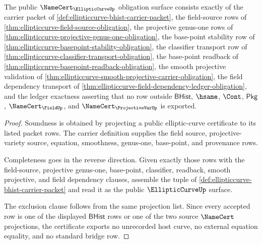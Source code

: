 \begin{theorem}\label{thm:ellipticcurve-namecert-exactness-obligation}
The public $\NameCert_{\EllipticCurveUp}$ obligation surface consists exactly of the carrier packet of \autoref{def:ellipticcurve-bhist-carrier-packet}, the field-source rows of \autoref{thm:ellipticcurve-field-source-obligation}, the projective genus-one rows of \autoref{thm:ellipticcurve-projective-genus-one-obligation}, the base-point stability row of \autoref{thm:ellipticcurve-basepoint-stability-obligation}, the classifier transport row of \autoref{thm:ellipticcurve-classifier-transport-obligation}, the base-point readback of \autoref{thm:ellipticcurve-basepoint-readback-obligation}, the smooth projective validation of \autoref{thm:ellipticcurve-smooth-projective-carrier-obligation}, the field dependency transport of \autoref{thm:ellipticcurve-field-dependency-ledger-obligation}, and the ledger exactness asserting that no row outside $\mathsf{BHist}$, $\hsame$, $\Cont$, $\mathsf{Pkg}$, $\NameCert_{\FieldUp}$, and $\NameCert_{\ProjectiveVarUp}$ is exported.
\end{theorem}
\begin{proof}
Soundness is obtained by projecting a public elliptic-curve certificate to its listed packet rows. The carrier definition supplies the field source, projective-variety source, equation, smoothness, genus-one, base-point, and provenance rows.

Completeness goes in the reverse direction. Given exactly those rows with the field-source, projective genus-one, base-point, classifier, readback, smooth projective, and field dependency clauses, assemble the tuple of \autoref{def:ellipticcurve-bhist-carrier-packet} and read it as the public $\EllipticCurveUp$ surface.

The exclusion clause follows from the same projection list. Since every accepted row is one of the displayed $\mathsf{BHist}$ rows or one of the two source $\NameCert$ projections, the certificate exports no unrecorded host curve, no external equation equality, and no standard bridge row.
\end{proof}

